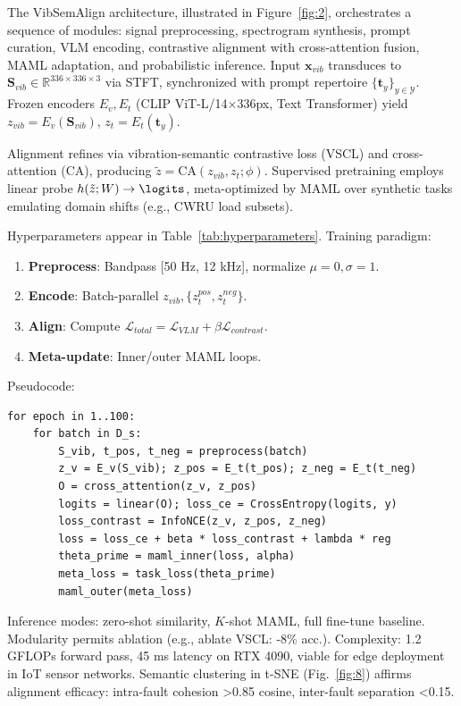 The VibSemAlign architecture, illustrated in Figure~\ref{fig:2}, orchestrates a sequence of modules: signal preprocessing, spectrogram synthesis, prompt curation, VLM encoding, contrastive alignment with cross-attention fusion, MAML adaptation, and probabilistic inference. Input $\mathbf{x}_{vib}$ transduces to $\mathbf{S}_{vib} \in \mathbb{R}^{336 \times 336 \times 3}$ via STFT, synchronized with prompt repertoire $\{\mathbf{t}_y\}_{y\in\mathcal{Y}}$. Frozen encoders $E_v, E_t$ (CLIP ViT-L/14$\times$336px, Text Transformer) yield $z_{vib} = E_v(\mathbf{S}_{vib})$, $z_t = E_t(\mathbf{t}_y)$.

Alignment refines via vibration-semantic contrastive loss (VSCL) and cross-attention (CA), producing $\tilde{z} = \mathrm{CA}(z_{vib}, z_t; \phi)$. Supervised pretraining employs linear probe $h(\tilde{z}; W) \to \logits$, meta-optimized by MAML over synthetic tasks emulating domain shifts (e.g., CWRU load subsets).

Hyperparameters appear in Table~\ref{tab:hyperparameters}. Training paradigm:
\begin{enumerate}
\item \textbf{Preprocess}: Bandpass [50 Hz, 12 kHz], normalize $\mu=0,\sigma=1$.
\item \textbf{Encode}: Batch-parallel $z_{vib}, \{z_t^{pos}, z_t^{neg}\}$.
\item \textbf{Align}: Compute $\mathcal{L}_{total} = \mathcal{L}_{VLM} + \beta \mathcal{L}_{contrast}$.
\item \textbf{Meta-update}: Inner/outer MAML loops.
\end{enumerate}
Pseudocode:
\begin{verbatim}
for epoch in 1..100:
    for batch in D_s:
        S_vib, t_pos, t_neg = preprocess(batch)
        z_v = E_v(S_vib); z_pos = E_t(t_pos); z_neg = E_t(t_neg)
        O = cross_attention(z_v, z_pos)
        logits = linear(O); loss_ce = CrossEntropy(logits, y)
        loss_contrast = InfoNCE(z_v, z_pos, z_neg)
        loss = loss_ce + beta * loss_contrast + lambda * reg
        theta_prime = maml_inner(loss, alpha)
        meta_loss = task_loss(theta_prime)
        maml_outer(meta_loss)
\end{verbatim}

Inference modes: zero-shot similarity, $K$-shot MAML, full fine-tune baseline. Modularity permits ablation (e.g., ablate VSCL: -8\% acc.). Complexity: 1.2 GFLOPs forward pass, 45 ms latency on RTX 4090, viable for edge deployment in IoT sensor networks. Semantic clustering in t-SNE (Fig.~\ref{fig:8}) affirms alignment efficacy: intra-fault cohesion >0.85 cosine, inter-fault separation <0.15.

